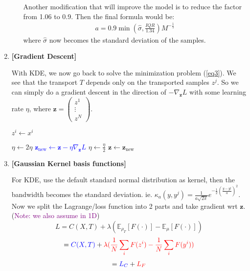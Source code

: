 \documentclass[11pt]{article}
\begin{document}
\begin{enumerate}
\begin{enumerate}
        Another modification that will improve the model is to reduce the factor from 1.06 to 0.9. Then the final formula would be:
        \begin{align*}
            a = 0.9 \min (\hat{\sigma}, \frac{IQR}{1.34}) M^{-\frac{1}{5}}
        \end{align*}
        where $\hat{\sigma}$ now becomes the standard deviation of the samples.
    \end{enumerate}
    
    \item {\bf [Gradient Descent]}
    
    With KDE, we now go back to solve the minimization problem (\ref{eq3}).
    We see that the transport $T$ depends only on the transported samples $z^j$. So we can simply do a gradient descent in the direction of $-\nabla_{\mathbf{z}} L$ with some learning rate $\eta$, where $\mathbf{z} = \begin{pmatrix}
    z^1 \\ \vdots \\ z^N
    \end{pmatrix}$.
    
        \begin{algorithm}[h]
        \caption{Gradient Descent w.r.t $\mathbf{z}$}
        \begin{algorithmic}
        \label{algo1}
        \State $z^i \gets x^i$
        \EndFor
            
        \State $\eta \gets 2\eta$ 
        \textcolor{blue}{\State $\mathbf{z}_{\text{new}} \gets \mathbf{z} - \eta \nabla_{\mathbf{z}} L$} 
         
        \State $\eta \gets \frac{\eta}{2}$ 
        \EndWhile
        \State $\mathbf{z} \gets \mathbf{z}_{\text{new}}$
        \EndWhile
            
        \end{algorithmic}
        \end{algorithm}
    
    \item {\bf [Gaussian Kernel basis functions]}
    
    For KDE, use the default standard normal distribution as kernel, then the bandwidth becomes the standard deviation.
    ie. $\kappa_a(y,y^j) = \frac{1}{a \sqrt{2\pi}} e^{-\frac{1}{2}(\frac{y-y^j}{a})^2}$. Now we split the Lagrange/loss function into 2 parts and take gradient wrt $\mathbf{z}$. (\textcolor{purple}{Note: we also assume in 1D})
    $$
    L = C(X,T) + \lambda (\mathbb{E}_{\rho_{T}} [F(\cdot)] - \mathbb{E}_{\mu} [F(\cdot)])
    $$
    $$
    = \textcolor{blue}{C(X,T)} + \textcolor{red}{\lambda (\frac{1}{N} \sum_i F(z^i) - \frac{1}{N} \sum_i F(y^i))}
    $$
    \begin{align}
        = \textcolor{blue}{L_C} + \textcolor{red}{L_F}
    \end{align}
    

\end{enumerate}
\end{document}
